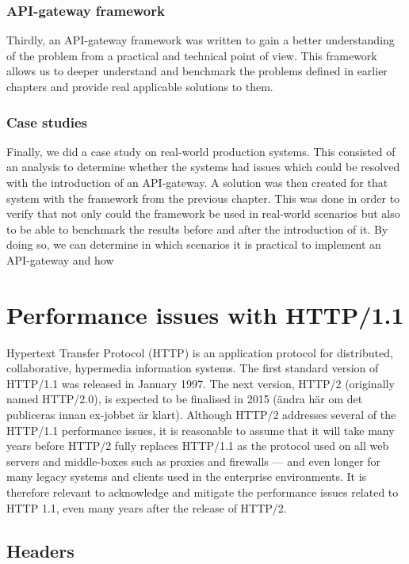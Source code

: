 \documentclass{cslthse-msc}
\begin{document}
\subsection{API-gateway framework}
Thirdly, an API-gateway framework was written to gain a better understanding of the problem from a practical and technical point of view. This framework allows us to deeper understand and benchmark the problems defined in earlier chapters and provide real applicable solutions to them.

\subsection{Case studies}
Finally, we did a case study on real-world production systems. This consisted of an analysis to determine whether the systems had issues which could be resolved with the introduction of an API-gateway. A solution was then created for that system with the framework from the previous chapter. This was done in order to verify that not only could the framework be used in real-world scenarios but also to be able to benchmark the results before and after the introduction of it. By doing so, we can determine in which scenarios it is practical to implement an API-gateway and how

\chapter{Performance issues with HTTP/1.1}
Hypertext Transfer Protocol (HTTP) is an application protocol for distributed, collaborative, hypermedia information systems\cite{http-info}. The first standard version of HTTP/1.1 was released in January 1997\cite{rfc2068}. The next version, HTTP/2 (originally named HTTP/2.0), is expected to be finalised in 2015 (ändra här om det publiceras innan ex-jobbet är klart). Although HTTP/2 addresses several of the HTTP/1.1 performance issues, it is reasonable to assume that it will take many years before HTTP/2 fully replaces HTTP/1.1 as the protocol used on all web servers and middle-boxes such as proxies and firewalls --- and even longer for many legacy systems and clients used in the enterprise environments. It is therefore relevant to  acknowledge and mitigate the performance issues related to HTTP 1.1, even many years after the release of HTTP/2.

\section{Headers}
\label{headers}
\end{document}
